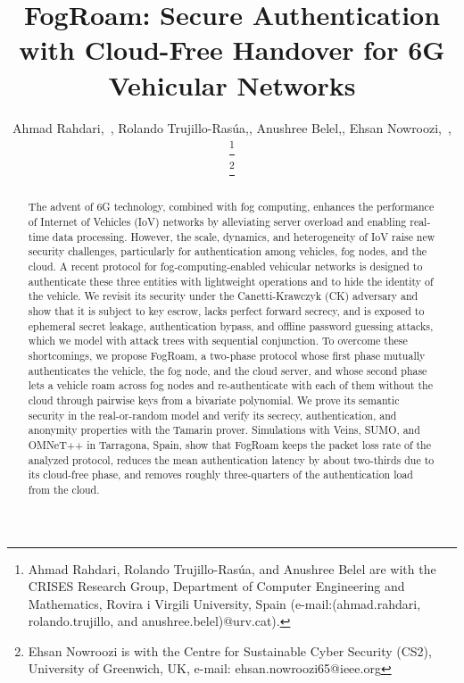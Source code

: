 \documentclass[journal]{IEEEtran}
\theoremstyle{plain}
\theoremstyle{definition}
\newcommand{\protocol}{\textsf{FogRoam}}   %
\begin{document}
\title{\texorpdfstring{\protocol}{FogRoam}: Secure Authentication with Cloud-Free Handover for 6G Vehicular Networks}

\author{Ahmad Rahdari,~, Rolando Trujillo-Rasúa,, Anushree	Belel,, Ehsan Nowroozi,~, 

\thanks{Ahmad Rahdari, Rolando Trujillo-Rasúa, and Anushree	Belel are with the CRISES Research Group, Department of Computer Engineering and Mathematics, Rovira i Virgili University, Spain (e-mail:(ahmad.rahdari, rolando.trujillo, and anushree.belel)@urv.cat).}


\thanks{Ehsan Nowroozi is with the Centre for Sustainable Cyber Security (CS2), University of Greenwich, UK, e-mail: {ehsan.nowroozi65@ieee.org}}



}




\maketitle

\begin{abstract}
The advent of 6G technology, combined with fog computing, enhances the performance of Internet of Vehicles (IoV) networks by alleviating server overload and enabling real-time data processing. However, the scale, dynamics, and heterogeneity of IoV raise new security challenges, particularly for authentication among vehicles, fog nodes, and the cloud. A recent protocol for fog-computing-enabled vehicular networks is designed to authenticate these three entities with lightweight operations and to hide the identity of the vehicle. We revisit its security under the Canetti-Krawczyk (CK) adversary and show that it is subject to key escrow, lacks perfect forward secrecy, and is exposed to ephemeral secret leakage, authentication bypass, and offline password guessing attacks, which we model with attack trees with sequential conjunction. To overcome these shortcomings, we propose {\protocol}, a two-phase protocol whose first phase mutually authenticates the vehicle, the fog node, and the cloud server, and whose second phase lets a vehicle roam across fog nodes and re-authenticate with each of them without the cloud through pairwise keys from a bivariate polynomial. We prove its semantic security in the real-or-random model and verify its secrecy, authentication, and anonymity properties with the Tamarin prover. Simulations with Veins, SUMO, and OMNeT++ in Tarragona, Spain, show that {\protocol} keeps the packet loss rate of the analyzed protocol, reduces the mean authentication latency by about two-thirds due to its cloud-free phase, and removes roughly three-quarters of the authentication load from the cloud.
\end{abstract}
\end{document}
